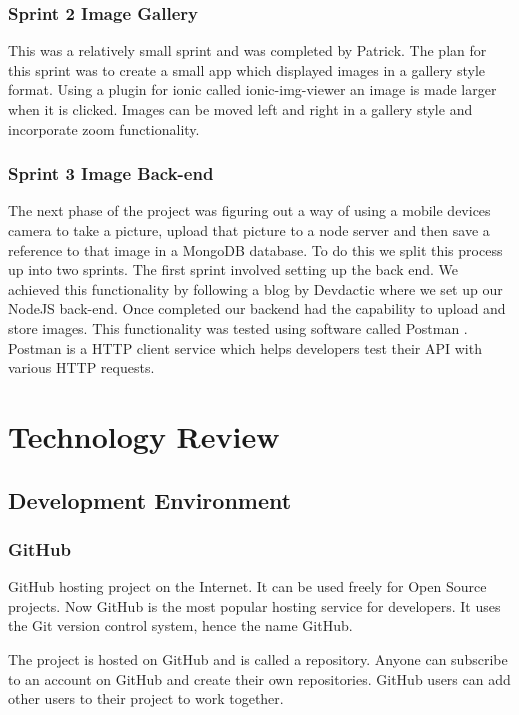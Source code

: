 \subsection{Sprint 2 Image Gallery}
This was a relatively small sprint and was completed by Patrick. The plan for this sprint was to create a small app which displayed images in a gallery style format. Using a plugin for ionic called ionic-img-viewer \cite{ImgViwer} an image is made larger when it is clicked. Images can be moved left and right in a gallery style and incorporate zoom functionality.

\subsection{Sprint 3 Image Back-end}
The next phase of the project was figuring out a way of using a mobile devices camera to take a picture, upload that picture to a node server and then save a reference to that image in a MongoDB database. To do this we split this process up into two sprints. The first sprint involved setting up the back end. We achieved this functionality by following a blog by Devdactic \cite{ImageBackEnd} where we set up our NodeJS back-end. Once completed our backend had the capability to upload and store images. This functionality was tested using software called Postman \cite{Postman}. Postman is a HTTP client service which helps developers test their API with various HTTP requests.

\chapter{Technology Review}

\section{Development Environment}

\subsection{GitHub}
GitHub hosting project on the Internet. It can be used freely for Open Source projects. Now GitHub is the most popular hosting service for developers. It uses the Git version control system, hence the name GitHub.\par

The project is hosted on GitHub and is called a repository. Anyone can subscribe to an account on GitHub and create their own repositories. GitHub users can add other users to their project to work together.\par

